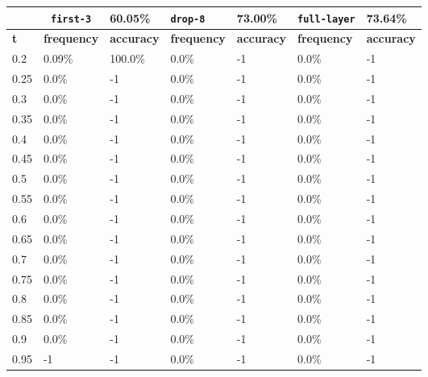 
\begin{table}[t]
\centering
\begin{tabular}{lllllll} %
\hline

\multicolumn{1}{c}{}& 
\multicolumn{1}{c}{\texttt{first-3}} & \multicolumn{1}{l|}{60.05\%} 
& \multicolumn{1}{l}{\texttt{drop-8}} & \multicolumn{1}{l|}{73.00\%}
& \multicolumn{1}{l}{\texttt{full-layer}} & 73.64\%
\\ \hline
\multicolumn{1}{l|}{\textbf{t}} &
\multicolumn{1}{l|}{\textbf{frequency}} & 
\multicolumn{1}{l|}{\textbf{accuracy}} & 
\multicolumn{1}{l|}{\textbf{frequency}} & 
\multicolumn{1}{l|}{\textbf{accuracy}} & 
\multicolumn{1}{l|}{\textbf{frequency}} & 
\multicolumn{1}{l|}{\textbf{accuracy}} \\ \hline
	\multicolumn{1}{l|}{0.2}&  0.09\% & \multicolumn{1}{l|}{100.0\%}& 0.0\% & \multicolumn{1}{l|}{-1}& 0.0\% & -1\\ 
\multicolumn{1}{l|}{0.25}&  0.0\% & \multicolumn{1}{l|}{-1}& 0.0\% & \multicolumn{1}{l|}{-1}& 0.0\% & -1\\ 
\multicolumn{1}{l|}{0.3}&  0.0\% & \multicolumn{1}{l|}{-1}& 0.0\% & \multicolumn{1}{l|}{-1}& 0.0\% & -1\\ 
\multicolumn{1}{l|}{0.35}&  0.0\% & \multicolumn{1}{l|}{-1}& 0.0\% & \multicolumn{1}{l|}{-1}& 0.0\% & -1\\ 
\multicolumn{1}{l|}{0.4}&  0.0\% & \multicolumn{1}{l|}{-1}& 0.0\% & \multicolumn{1}{l|}{-1}& 0.0\% & -1\\ 
\multicolumn{1}{l|}{0.45}&  0.0\% & \multicolumn{1}{l|}{-1}& 0.0\% & \multicolumn{1}{l|}{-1}& 0.0\% & -1\\ 
\multicolumn{1}{l|}{0.5}&  0.0\% & \multicolumn{1}{l|}{-1}& 0.0\% & \multicolumn{1}{l|}{-1}& 0.0\% & -1\\ 
\multicolumn{1}{l|}{0.55}&  0.0\% & \multicolumn{1}{l|}{-1}& 0.0\% & \multicolumn{1}{l|}{-1}& 0.0\% & -1\\ 
\multicolumn{1}{l|}{0.6}&  0.0\% & \multicolumn{1}{l|}{-1}& 0.0\% & \multicolumn{1}{l|}{-1}& 0.0\% & -1\\ 
\multicolumn{1}{l|}{0.65}&  0.0\% & \multicolumn{1}{l|}{-1}& 0.0\% & \multicolumn{1}{l|}{-1}& 0.0\% & -1\\ 
\multicolumn{1}{l|}{0.7}&  0.0\% & \multicolumn{1}{l|}{-1}& 0.0\% & \multicolumn{1}{l|}{-1}& 0.0\% & -1\\ 
\multicolumn{1}{l|}{0.75}&  0.0\% & \multicolumn{1}{l|}{-1}& 0.0\% & \multicolumn{1}{l|}{-1}& 0.0\% & -1\\ 
\multicolumn{1}{l|}{0.8}&  0.0\% & \multicolumn{1}{l|}{-1}& 0.0\% & \multicolumn{1}{l|}{-1}& 0.0\% & -1\\ 
\multicolumn{1}{l|}{0.85}&  0.0\% & \multicolumn{1}{l|}{-1}& 0.0\% & \multicolumn{1}{l|}{-1}& 0.0\% & -1\\ 
\multicolumn{1}{l|}{0.9}&  0.0\% & \multicolumn{1}{l|}{-1}& 0.0\% & \multicolumn{1}{l|}{-1}& 0.0\% & -1\\ 
\multicolumn{1}{l|}{0.95}&  -1 & \multicolumn{1}{l|}{-1}& 0.0\% & \multicolumn{1}{l|}{-1}& 0.0\% & -1\\ 


\end{tabular}
\end{table}
